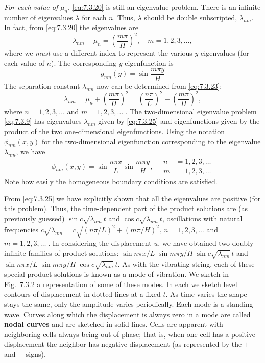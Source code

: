 \emph{For each value of} $\mu_n$, \eqref{eq:7.3.20} is still an eigenvalue problem.  There is an infinite number of eigenvalues $\lambda$ for each $n$.  Thus, $\lambda$ should be double subscripted, $\lambda_{nm}$.  In fact, from \eqref{eq:7.3.20} the eigenvalues are
\begin{equation}
\lambda_{nm} - \mu_n = \left(\frac{m\pi}{H}\right)^2, \quad m = 1, 2, 3, \ldots,
\label{eq:7.3.23}
\end{equation}
where we \emph{must} use a different index to represent the various $y$-eigenvalues (for each value of $n$).  The corresponding $y$-eigenfunction is
\begin{equation}
g_{nm}(y) = \sin\frac{m\pi y}{H}
\label{eq:7.3.24}
\end{equation}
The separation constant $\lambda_{nm}$ now can be determined from \eqref{eq:7.3.23}:
\begin{equation}
\boxed{\lambda_{nm} = \mu_n + \left(\frac{m\pi}{H}\right)^2 = \left(\frac{n\pi}{L}\right)^2 + \left(\frac{m\pi}{H}\right)^2,}
\label{eq:7.3.25}
\end{equation}
where $n = 1, 2, 3, \ldots$ and $m = 1, 2, 3, \ldots\;$.  The two-dimensional eigenvalue problem \eqref{eq:7.3.9} has eigenvalues $\lambda_{nm}$ given by \eqref{eq:7.3.25} and eigenfunctions given by the product of the two one-dimensional eigenfunctions.  Using the notation $\phi_{nm}(x,y)$ for the two-dimensional eigenfunction corresponding to the eigenvalue $\lambda_{nm}$, we have
\begin{equation}
\boxed{\phi_{nm}(x,y) = \sin\frac{n\pi x}{L}\sin\frac{m\pi y}{H}, \quad
\begin{aligned}
n &= 1, 2, 3, \ldots \\
m &= 1, 2, 3, \ldots
\end{aligned}}
\label{eq:7.3.26}
\end{equation}
Note how easily the homogeneous boundary conditions are satisfied.

From \eqref{eq:7.3.25} we have explicitly shown that all the eigenvalues are positive (for this problem).  Thus, the time-dependent part of the product solutions are (as previously guessed) $\sin c\sqrt{\lambda_{nm}}\,t$ and $\cos c\sqrt{\lambda_{nm}}\,t$, oscillations with natural frequencies $c\sqrt{\lambda_{nm}} = c\sqrt{(n\pi/L)^2 + (m\pi/H)^2}$, $n = 1, 2, 3, \ldots$ and $m = 1, 2, 3, \ldots\;$.  In considering the displacement $u$, we have obtained two doubly infinite families of product solutions: $\sin n\pi x/L\;\sin m\pi y/H\;\sin c\sqrt{\lambda_{nm}}\,t$ and $\sin n\pi x/L\;\sin m\pi y/H\;\cos c\sqrt{\lambda_{nm}}\,t$.  As with the vibrating string, each of these special product solutions is known as a mode of vibration.  We sketch in Fig.~7.3.2 a representation of some of these modes.  In each we sketch level contours of displacement in dotted lines at a fixed $t$.  As time varies the shape stays the same, only the amplitude varies periodically.  Each mode is a standing wave.  Curves along which the displacement is always zero in a mode are called \textbf{nodal curves} and are sketched in solid lines.  Cells are apparent with neighboring cells always being out of phase; that is, when one cell has a positive displacement the neighbor has negative displacement (as represented by the $+$ and $-$ signs).

